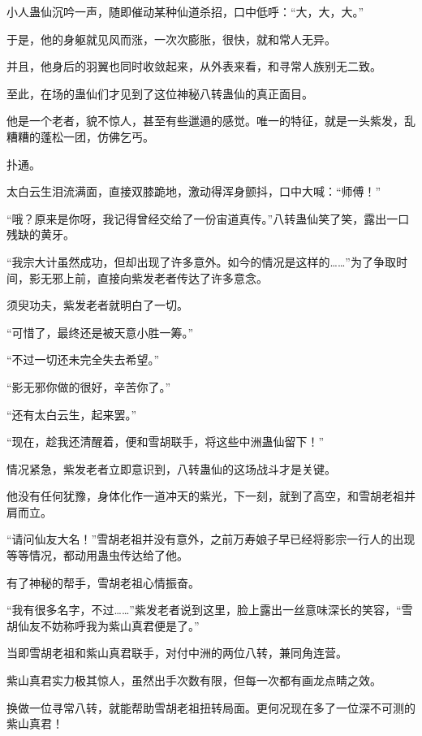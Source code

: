 
\begin{this_body}

小人蛊仙沉吟一声，随即催动某种仙道杀招，口中低呼：“大，大，大。”

于是，他的身躯就见风而涨，一次次膨胀，很快，就和常人无异。

并且，他身后的羽翼也同时收敛起来，从外表来看，和寻常人族别无二致。

至此，在场的蛊仙们才见到了这位神秘八转蛊仙的真正面目。

他是一个老者，貌不惊人，甚至有些邋遢的感觉。唯一的特征，就是一头紫发，乱糟糟的蓬松一团，仿佛乞丐。

扑通。

太白云生泪流满面，直接双膝跪地，激动得浑身颤抖，口中大喊：“师傅！”

“哦？原来是你呀，我记得曾经交给了一份宙道真传。”八转蛊仙笑了笑，露出一口残缺的黄牙。

“我宗大计虽然成功，但却出现了许多意外。如今的情况是这样的……”为了争取时间，影无邪上前，直接向紫发老者传达了许多意念。

须臾功夫，紫发老者就明白了一切。

“可惜了，最终还是被天意小胜一筹。”

“不过一切还未完全失去希望。”

“影无邪你做的很好，辛苦你了。”

“还有太白云生，起来罢。”

“现在，趁我还清醒着，便和雪胡联手，将这些中洲蛊仙留下！”

情况紧急，紫发老者立即意识到，八转蛊仙的这场战斗才是关键。

他没有任何犹豫，身体化作一道冲天的紫光，下一刻，就到了高空，和雪胡老祖并肩而立。

“请问仙友大名！”雪胡老祖并没有意外，之前万寿娘子早已经将影宗一行人的出现等等情况，都动用蛊虫传达给了他。

有了神秘的帮手，雪胡老祖心情振奋。

“我有很多名字，不过……”紫发老者说到这里，脸上露出一丝意味深长的笑容，“雪胡仙友不妨称呼我为紫山真君便是了。”

当即雪胡老祖和紫山真君联手，对付中洲的两位八转，兼同角连营。

紫山真君实力极其惊人，虽然出手次数有限，但每一次都有画龙点睛之效。

换做一位寻常八转，就能帮助雪胡老祖扭转局面。更何况现在多了一位深不可测的紫山真君！


\end{this_body}
